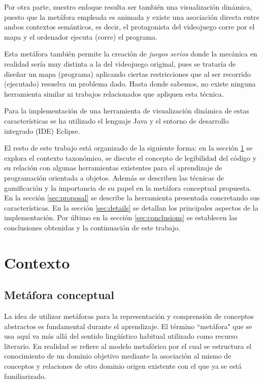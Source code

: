 \documentclass{llncs}
\begin{document}
Por otra parte, nuestro enfoque resulta ser también una visualización dinámica, puesto que la metáfora empleada es animada y existe una asociación directa entre ambos contextos semánticos, es decir, el protagonista del videojuego corre por el mapa y el ordenador ejecuta (corre) el programa. 

Esta metáfora también permite la creación de \emph{juegos serios} donde la mecánica en realidad sería muy distinta a la del videojuego original, pues se trataría de diseñar un mapa (programa) aplicando ciertas restricciones que al ser recorrido (ejecutado) resuelva un problema dado. Hasta donde sabemos, no existe ninguna herramienta similar ni trabajos relacionados que apliquen esta técnica.

Para la implementación de una herramienta de visualización dinámica de estas características se ha utilizado el lenguaje Java y el entorno de desarrollo integrado (IDE) Eclipse. 

El resto de este trabajo está organizado de la siguiente forma: en la sección \ref{sec:background} se explora el contexto taxonómico, se discute el concepto de legibilidad del código y su relación con algunas herramientas existentes para el aprendizaje de programación orientada a objetos. Además se describen las técnicas de gamificación y la importancia de su papel en la metáfora conceptual propuesta. En la sección \ref{sec:proposal} se describe la herramienta presentada concretando sus características. En la sección \ref{sec:details} se detallan los principales aspectos de la implementación. Por último en la sección \ref{sec:conclusions} se establecen las conclusiones obtenidas y la continuación de este trabajo. 

%
%
\section{Contexto}
\label{sec:background}
\subsection{Metáfora conceptual}

La idea de utilizar metáforas para la representación y comprensión de conceptos abstractos es fundamental durante el aprendizaje. El término ``metáfora" que se usa aquí va más allá del sentido lingüístico habitual utilizado como recurso literario. En realidad se refiere al modelo metafórico por el cual se estructura el conocimiento de un dominio objetivo mediante la asociación al mismo de conceptos y relaciones de otro dominio origen existente con el que ya se está familiarizado. 
\end{document}
